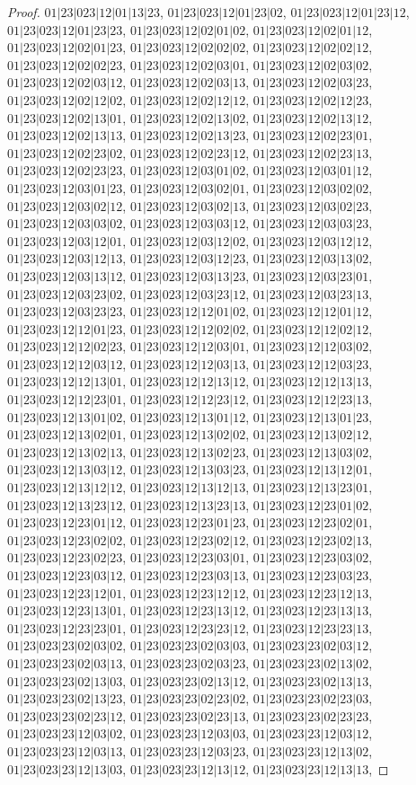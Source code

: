 \documentclass[12pt]{article}
\theoremstyle{plain}
\theoremstyle{definition}
\theoremstyle{remark}
\begin{document}
\begin{proof}
$01|23|023|12|01|13|23$, $01|23|023|12|01|23|02$, $01|23|023|12|01|23|12$, $01|23|023|12|01|23|23$, $01|23|023|12|02|01|02$, $01|23|023|12|02|01|12$, $01|23|023|12|02|01|23$, $01|23|023|12|02|02|02$, $01|23|023|12|02|02|12$, $01|23|023|12|02|02|23$, $01|23|023|12|02|03|01$, $01|23|023|12|02|03|02$, $01|23|023|12|02|03|12$, $01|23|023|12|02|03|13$, $01|23|023|12|02|03|23$, $01|23|023|12|02|12|02$, $01|23|023|12|02|12|12$, $01|23|023|12|02|12|23$, $01|23|023|12|02|13|01$, $01|23|023|12|02|13|02$, $01|23|023|12|02|13|12$, $01|23|023|12|02|13|13$, $01|23|023|12|02|13|23$, $01|23|023|12|02|23|01$, $01|23|023|12|02|23|02$, $01|23|023|12|02|23|12$, $01|23|023|12|02|23|13$, $01|23|023|12|02|23|23$, $01|23|023|12|03|01|02$, $01|23|023|12|03|01|12$, $01|23|023|12|03|01|23$, $01|23|023|12|03|02|01$, $01|23|023|12|03|02|02$, $01|23|023|12|03|02|12$, $01|23|023|12|03|02|13$, $01|23|023|12|03|02|23$, $01|23|023|12|03|03|02$, $01|23|023|12|03|03|12$, $01|23|023|12|03|03|23$, $01|23|023|12|03|12|01$, $01|23|023|12|03|12|02$, $01|23|023|12|03|12|12$, $01|23|023|12|03|12|13$, $01|23|023|12|03|12|23$, $01|23|023|12|03|13|02$, $01|23|023|12|03|13|12$, $01|23|023|12|03|13|23$, $01|23|023|12|03|23|01$, $01|23|023|12|03|23|02$, $01|23|023|12|03|23|12$, $01|23|023|12|03|23|13$, $01|23|023|12|03|23|23$, $01|23|023|12|12|01|02$, $01|23|023|12|12|01|12$, $01|23|023|12|12|01|23$, $01|23|023|12|12|02|02$, $01|23|023|12|12|02|12$, $01|23|023|12|12|02|23$, $01|23|023|12|12|03|01$, $01|23|023|12|12|03|02$, $01|23|023|12|12|03|12$, $01|23|023|12|12|03|13$, $01|23|023|12|12|03|23$, $01|23|023|12|12|13|01$, $01|23|023|12|12|13|12$, $01|23|023|12|12|13|13$, $01|23|023|12|12|23|01$, $01|23|023|12|12|23|12$, $01|23|023|12|12|23|13$, $01|23|023|12|13|01|02$, $01|23|023|12|13|01|12$, $01|23|023|12|13|01|23$, $01|23|023|12|13|02|01$, $01|23|023|12|13|02|02$, $01|23|023|12|13|02|12$, $01|23|023|12|13|02|13$, $01|23|023|12|13|02|23$, $01|23|023|12|13|03|02$, $01|23|023|12|13|03|12$, $01|23|023|12|13|03|23$, $01|23|023|12|13|12|01$, $01|23|023|12|13|12|12$, $01|23|023|12|13|12|13$, $01|23|023|12|13|23|01$, $01|23|023|12|13|23|12$, $01|23|023|12|13|23|13$, $01|23|023|12|23|01|02$, $01|23|023|12|23|01|12$, $01|23|023|12|23|01|23$, $01|23|023|12|23|02|01$, $01|23|023|12|23|02|02$, $01|23|023|12|23|02|12$, $01|23|023|12|23|02|13$, $01|23|023|12|23|02|23$, $01|23|023|12|23|03|01$, $01|23|023|12|23|03|02$, $01|23|023|12|23|03|12$, $01|23|023|12|23|03|13$, $01|23|023|12|23|03|23$, $01|23|023|12|23|12|01$, $01|23|023|12|23|12|12$, $01|23|023|12|23|12|13$, $01|23|023|12|23|13|01$, $01|23|023|12|23|13|12$, $01|23|023|12|23|13|13$, $01|23|023|12|23|23|01$, $01|23|023|12|23|23|12$, $01|23|023|12|23|23|13$, $01|23|023|23|02|03|02$, $01|23|023|23|02|03|03$, $01|23|023|23|02|03|12$, $01|23|023|23|02|03|13$, $01|23|023|23|02|03|23$, $01|23|023|23|02|13|02$, $01|23|023|23|02|13|03$, $01|23|023|23|02|13|12$, $01|23|023|23|02|13|13$, $01|23|023|23|02|13|23$, $01|23|023|23|02|23|02$, $01|23|023|23|02|23|03$, $01|23|023|23|02|23|12$, $01|23|023|23|02|23|13$, $01|23|023|23|02|23|23$, $01|23|023|23|12|03|02$, $01|23|023|23|12|03|03$, $01|23|023|23|12|03|12$, $01|23|023|23|12|03|13$, $01|23|023|23|12|03|23$, $01|23|023|23|12|13|02$, $01|23|023|23|12|13|03$, $01|23|023|23|12|13|12$, $01|23|023|23|12|13|13$, 
\end{proof}
\end{document}
